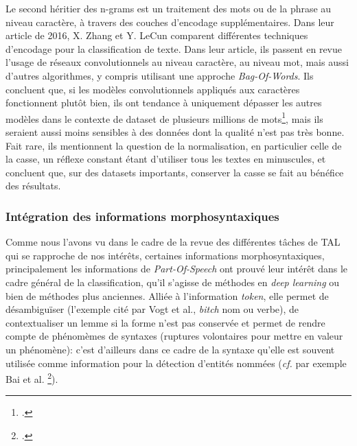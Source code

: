 Le second héritier des n-grams est un traitement des mots ou de la phrase au niveau caractère, à travers des couches d'encodage supplémentaires. Dans leur article de 2016, X. Zhang et Y. LeCun comparent différentes techniques d'encodage pour la classification de texte. Dans leur article, ils passent en revue l'usage de réseaux convolutionnels au niveau caractère, au niveau mot, mais aussi d'autres algorithmes, y compris utilisant une approche \textit{Bag-Of-Words}. Ils concluent que, si les modèles convolutionnels appliqués aux caractères fonctionnent plutôt bien, ils ont tendance à uniquement dépasser les autres modèles dans le contexte de dataset de plusieurs millions de mots\footcite[p. 7]{zhang_text_2016}, mais ils seraient aussi moins sensibles à des données dont la qualité n'est pas très bonne. Fait rare, ils mentionnent la question de la normalisation, en particulier celle de la casse, un réflexe constant étant d'utiliser tous les textes en minuscules, et concluent que, sur des datasets importants, conserver la casse se fait au bénéfice des résultats. 



\subsubsection{Intégration des informations morphosyntaxiques}

Comme nous l'avons vu dans le cadre de la revue des différentes tâches de TAL qui se rapproche de nos intérêts, certaines informations morphosyntaxiques, principalement les informations de \textit{Part-Of-Speech} ont prouvé leur intérêt dans le cadre général de  la classification, qu'il s'agisse de méthodes en \textit{deep learning} ou bien de méthodes plus anciennes. Alliée à l'information \textit{token}, elle permet de désambiguïser (l'exemple cité par Vogt et al., \textit{bitch} nom ou verbe), de contextualiser un lemme si la forme n'est pas conservée et permet de rendre compte de phénomèmes de syntaxes (ruptures volontaires pour mettre en valeur un phénomène): c'est d'ailleurs dans ce cadre de la syntaxe qu'elle est souvent utilisée comme information pour la détection d'entités nommées (\textit{cf.} par exemple  Bai et al. \footcite{bai_adversarial_2020}). 

